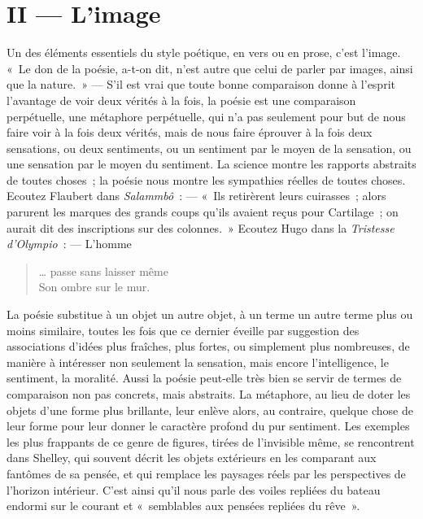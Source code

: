 \documentclass[french,twoside]{book} %
\begin{document}
\section[{II — L’image}]{II — L’image}
\noindent Un des éléments essentiels du style poétique, en vers ou en prose, c’est l’image. « Le don de la poésie, a-t-on dit, n’est autre que celui de parler par images, ainsi que la nature. » — S’il est vrai que toute bonne comparaison donne à l’esprit l’avantage de voir deux vérités à la fois, la poésie est une comparaison perpétuelle, une métaphore perpétuelle, qui n’a pas seulement pour but de nous faire voir à la fois deux vérités, mais de nous faire éprouver à la fois deux sensations, ou deux sentiments, ou un sentiment par le moyen de la sensation, ou une sensation par le moyen du sentiment. La science montre les rapports abstraits de toutes choses ; la poésie nous montre les sympathies réelles de toutes choses. Ecoutez Flaubert dans \emph{Salammbô} : — « Ils retirèrent leurs cuirasses ; alors parurent les marques des grands coups qu’ils avaient reçus pour Cartilage ; on aurait dit des inscriptions sur des colonnes. » Ecoutez Hugo dans la \emph{Tristesse d’Olympio} : — L’homme\par


\begin{verse}
… passe sans laisser même\\
Son ombre sur le mur.\\
\end{verse}

\noindent La poésie substitue à un objet un autre objet, à un terme un autre terme plus ou moins similaire, toutes les fois que ce dernier éveille par suggestion des associations d’idées plus fraîches, plus fortes, ou simplement plus nombreuses, de manière à intéresser non seulement la sensation, mais encore l’intelligence, le sentiment, la moralité. Aussi la poésie peut-elle très bien se servir de termes de comparaison non pas concrets, mais abstraits. La métaphore, au lieu de doter les objets d’une forme plus brillante, leur enlève alors, au contraire, quelque chose de leur forme pour leur donner le caractère profond du pur sentiment. Les exemples les plus frappants de ce genre de figures, tirées de l’invisible même, se rencontrent dans Shelley, qui souvent décrit les objets extérieurs en les comparant aux fantômes de sa pensée, et qui remplace les paysages réels par les perspectives de l’horizon intérieur. C’est ainsi qu’il nous parle des voiles repliées du bateau endormi sur le courant et « semblables aux pensées repliées du rêve ».\par
\end{document}
